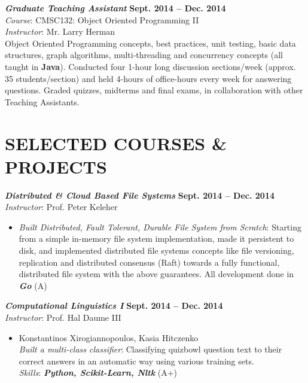 \documentclass[margin, 10pt]{res} %
\begin{document}
\begin{resume}
{\sl \textbf{Graduate Teaching Assistant}} \hfill \textbf{Sept. 2014 -- Dec. 2014}\\
\textit{Course}: CMSC132: Object Oriented Programming II \\
\textit{Instructor}: Mr. Larry Herman\\
Object Oriented Programming concepts, best practices, unit testing, basic data structures, graph algorithms, multi-threading and concurrency concepts (all taught in \textbf{Java}). Conducted four 1-hour long discussion sections/week (approx. 35 students/section) and held 4-hours of office-hours every week for answering questions. Graded quizzes, midterms and final exams, in collaboration with other Teaching Assistants.



\section{SELECTED COURSES \& PROJECTS}

{\sl \textbf{Distributed \& Cloud Based File Systems}} \hfill \textbf{Sept. 2014 -- Dec. 2014}\\
\textit{Instructor}: Prof. Peter Keleher
\begin{itemize}
  \item \textit{Built Distributed, Fault Tolerant, Durable File System from Scratch}: Starting from a simple in-memory file system implementation, made it persistent to disk, and implemented distributed file systems concepts like file versioning, replication and distributed consensus (Raft) towards a fully functional, distributed file system with the above guarantees. All development done in \textbf{\textit{Go}} (A)
\end{itemize}


{\sl \textbf{Computational Linguistics I}} \hfill \textbf{Sept. 2014 -- Dec. 2014}\\
\textit{Instructor}: Prof. Hal Daume III
\begin{itemize}
  \item
  Konstantinos Xirogiannopoulos, Kasia Hitczenko\\
  \textit{Built a multi-class classifier}: Classifying quizbowl question text to their correct answers in an automatic way using various training sets.\\ \textit{Skills}: \textbf{\textit{Python, Scikit-Learn, Nltk}} (A+)
\end{itemize}


\end{resume}
\end{document}
